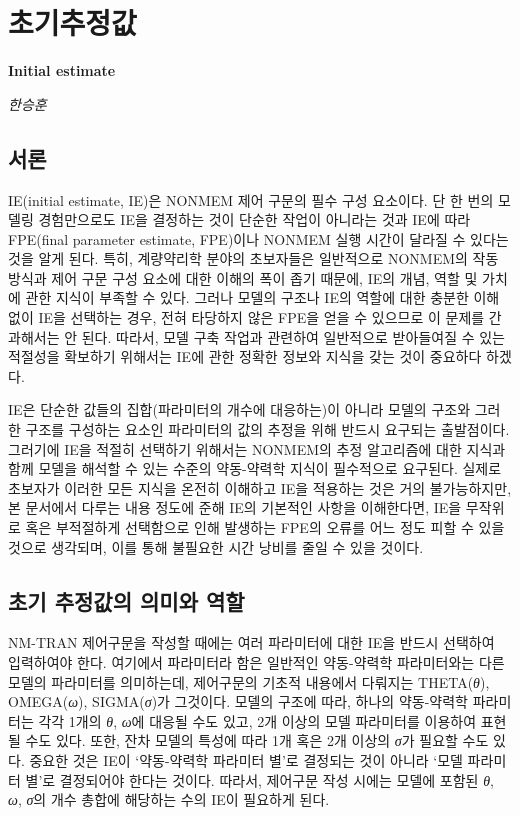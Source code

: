 \documentclass[
  10pt,
  krantz2,
  a4paper]{krantz}
\theoremstyle{definition}
\theoremstyle{definition}
\theoremstyle{definition}
\theoremstyle{remark}
\begin{document}
\hypertarget{IE}{%
\chapter{초기추정값}\label{IE}}

\textbf{Initial estimate}

\emph{한승훈}

\hypertarget{uxc11cuxb860}{%
\section{서론}\label{uxc11cuxb860}}

IE(initial estimate, IE)은 NONMEM 제어 구문의 필수 구성 요소이다. 단 한 번의 모델링 경험만으로도 IE을 결정하는 것이 단순한 작업이 아니라는 것과 IE에 따라 FPE(final parameter estimate, FPE)이나 NONMEM 실행 시간이 달라질 수 있다는 것을 알게 된다. 특히, 계량약리학 분야의 초보자들은 일반적으로 NONMEM의 작동 방식과 제어 구문 구성 요소에 대한 이해의 폭이 좁기 때문에, IE의 개념, 역할 및 가치에 관한 지식이 부족할 수 있다. 그러나 모델의 구조나 IE의 역할에 대한 충분한 이해 없이 IE을 선택하는 경우, 전혀 타당하지 않은 FPE을 얻을 수 있으므로 이 문제를 간과해서는 안 된다. 따라서, 모델 구축 작업과 관련하여 일반적으로 받아들여질 수 있는 적절성을 확보하기 위해서는 IE에 관한 정확한 정보와 지식을 갖는 것이 중요하다 하겠다.

IE은 단순한 값들의 집합(파라미터의 개수에 대응하는)이 아니라 모델의 구조와 그러한 구조를 구성하는 요소인 파라미터의 값의 추정을 위해 반드시 요구되는 출발점이다. 그러기에 IE을 적절히 선택하기 위해서는 NONMEM의 추정 알고리즘에 대한 지식과 함께 모델을 해석할 수 있는 수준의 약동-약력학 지식이 필수적으로 요구된다. 실제로 초보자가 이러한 모든 지식을 온전히 이해하고 IE을 적용하는 것은 거의 불가능하지만, 본 문서에서 다루는 내용 정도에 준해 IE의 기본적인 사항을 이해한다면, IE을 무작위로 혹은 부적절하게 선택함으로 인해 발생하는 FPE의 오류를 어느 정도 피할 수 있을 것으로 생각되며, 이를 통해 불필요한 시간 낭비를 줄일 수 있을 것이다.

\hypertarget{IE-role}{%
\section{초기 추정값의 의미와 역할}\label{IE-role}}

NM-TRAN 제어구문을 작성할 때에는 여러 파라미터에 대한 IE을 반드시 선택하여 입력하여야 한다. 여기에서 파라미터라 함은 일반적인 약동-약력학 파라미터와는 다른 모델의 파라미터를 의미하는데, 제어구문의 기초적 내용에서 다뤄지는 THETA(\emph{θ}), OMEGA(\emph{ω}), SIGMA(\emph{σ})가 그것이다. 모델의 구조에 따라, 하나의 약동-약력학 파라미터는 각각 1개의 \emph{θ}, \emph{ω}에 대응될 수도 있고, 2개 이상의 모델 파라미터를 이용하여 표현될 수도 있다. 또한, 잔차 모델의 특성에 따라 1개 혹은 2개 이상의 \emph{σ}가 필요할 수도 있다. 중요한 것은 IE이 `약동-약력학 파라미터 별'로 결정되는 것이 아니라 `모델 파라미터 별'로 결정되어야 한다는 것이다. 따라서, 제어구문 작성 시에는 모델에 포함된 \emph{θ}, \emph{ω}, \emph{σ}의 개수 총합에 해당하는 수의 IE이 필요하게 된다.
\end{document}
